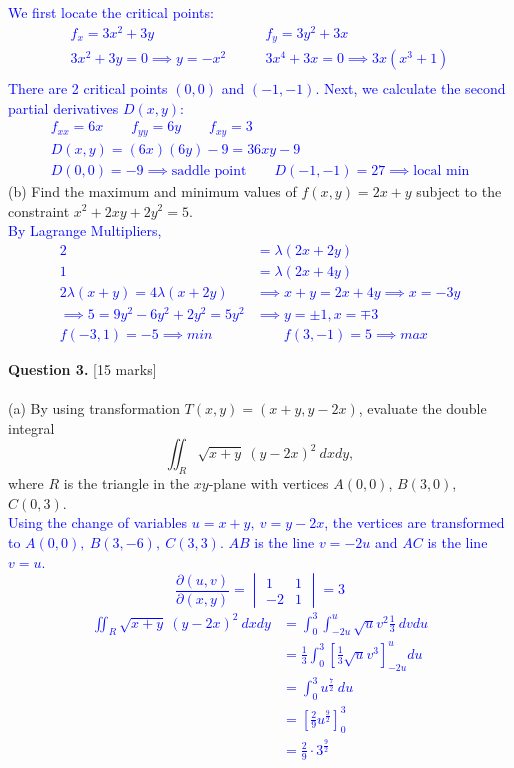 \documentclass[12pt]{article}
\begin{document}
\textcolor{blue}{
We first locate the critical points:\\
\begin{align*}
	f_x=3x^2+3y &\qquad f_y=3y^2+3x\\
	3x^2+3y=0\implies y=-x^2 &\qquad 3x^4+3x=0\implies 3x(x^3+1)\\
\end{align*}
\indent There are 2 critical points $(0,0)$ and $(-1,-1)$. Next, we calculate the second partial derivatives $D(x,y)$:
\begin{gather*}
	f_{xx}=6x\qquad f_{yy}=6y\qquad f_{xy}=3\\
	D(x,y)=(6x)(6y)-9=36xy-9\\
	D(0,0)=-9\implies\text{saddle point} \qquad D(-1,-1)=27\implies\text{local min}
\end{gather*}
}
(b) Find the maximum and minimum values of $f(x,y)=2x+y$ subject to the constraint $x^2+2xy+2y^2=5$.\\

\textcolor{blue}{
By Lagrange Multipliers, \begin{align*}
	2&=\lambda (2x+2y)\\
	1&=\lambda (2x+4y)\\
	2\lambda(x+y)=4\lambda(x+2y)&\implies x+y=2x+4y\implies x=-3y\\
	\implies 5=9y^2-6y^2+2y^2=5y^2&\implies y=\pm1,x=\mp3\\
	f(-3,1)=-5\implies min &\qquad f(3,-1)=5\implies max
\end{align*}
}

{\bf Question 3.} [15 marks]\\
\\\indent
(a) By using transformation $T(x,y)=(x+y,y-2x)$, evaluate the double integral
\[
\iint_R\sqrt{x+y}\ (y-2x)^2\ dxdy,
\]
\indent\indent where $R$ is the triangle in the $xy$-plane with vertices $A(0,0)$, $B(3,0)$, $C(0,3)$.\\

\textcolor{blue}{
Using the change of variables $u=x+y,\ v=y-2x$, the vertices are transformed to $A(0,0),\ B(3,-6),\ C(3,3)$. $AB$ is the line $v=-2u$ and $AC$ is the line $v=u$.
\[
\frac{\partial(u,v)}{\partial(x,y)}=\begin{vmatrix}
	1 & 1\\
	-2 & 1
\end{vmatrix}=3
\]
\begin{align*}
	\iint_R\sqrt{x+y}\ (y-2x)^2\ dxdy &= \int_{0}^{3}\int_{-2u}^{u}\sqrt{u}v^2\frac{1}{3}\ dvdu\\
	&=\frac{1}{3}\int_{0}^{3}\left[\frac{1}{3}\sqrt{u}v^3\right]_{-2u}^{u}du\\
	&=\int_{0}^{3}u^{\frac{7}{2}}\ du\\
	&=\left[\frac{2}{9}u^{\frac{9}{2}}\right]_{0}^{3}\\
	&=\frac{2}{9}\cdot3^{\frac{9}{2}}
\end{align*}}
\end{document}

